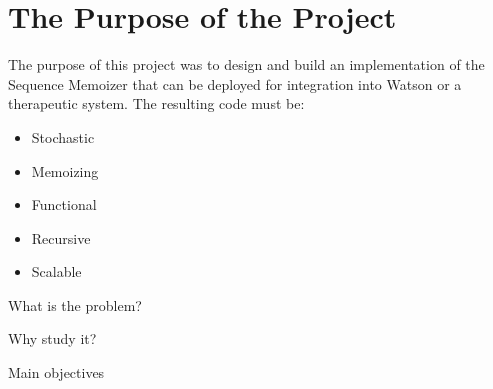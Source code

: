 


\section{The Purpose of the Project}


The purpose of this project was to design and build an implementation of the Sequence Memoizer that can be deployed for integration into Watson or a therapeutic system. The resulting code must be:

\begin{itemize}
\item Stochastic
\item Memoizing
\item Functional
\item Recursive
\item Scalable
\end{itemize}


What is the problem?

Why study it?

Main objectives

%
